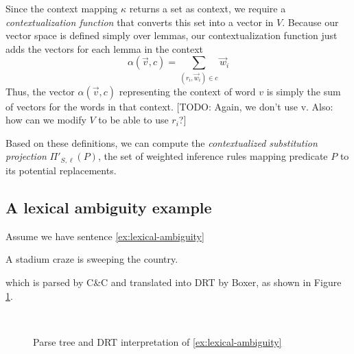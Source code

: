 Since the context mapping $\kappa$ returns a set as context, we require a
\textit{contextualization function} that converts this set into a vector in $V$.
Because our vector space is defined simply over lemmas, our contextualization
function just adds the vectors for each lemma in the context \[ \alpha(\vec v,
c) = \sum_{(r_i, \vec w_i) \in c} \vec w_i \]  Thus, the vector $\alpha(\vec v,
c)$ representing the context of word $v$ is simply the sum of vectors for the
words in that context.
[TODO: Again, we don't use \vec v.  Also: how can we modify $V$ to be able to
use $r_i$?]

Based on these definitions, we can compute the \textit{contextualized
substitution projection} $\Pi'_{S, \ell}(P)$, the set of weighted inference
rules mapping predicate $P$ to its potential replacements.


\subsection*{A lexical ambiguity example}

Assume we have sentence \eqref{ex:lexical-ambiguity}

\begin{example}\label{ex:lexical-ambiguity}
  A stadium craze is sweeping the country.
\end{example}

which is parsed by C\&C and translated into DRT by Boxer, as shown in Figure
\ref{drs:lexical-ambiguity}.

\begin{figure}
  \centering
  ~~~~~~~~~
  \caption{Parse tree and DRT interpretation of \eqref{ex:lexical-ambiguity}}
  \label{drs:lexical-ambiguity}
\end{figure}

